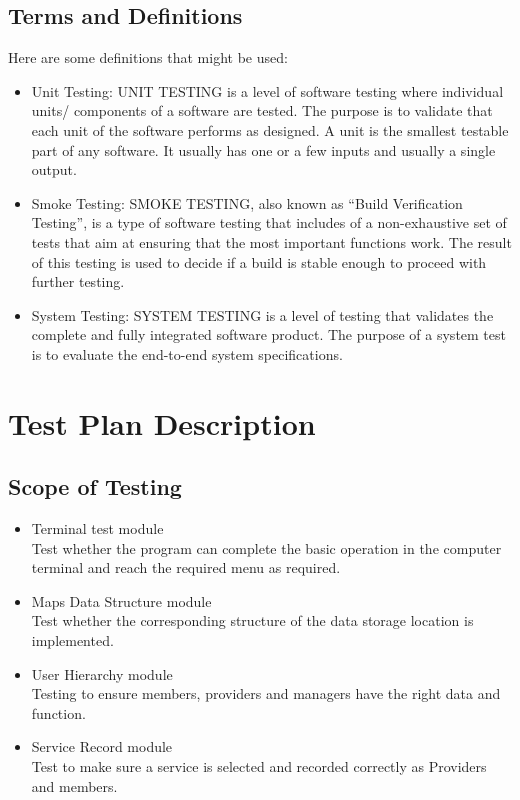 \documentclass{article}
\begin{document}
\subsection{Terms and Definitions}
Here are some definitions that might be used:

\begin{itemize}
\item Unit Testing: UNIT TESTING is a level of software testing where
individual units/ components of a software are tested. The
purpose is to validate that each unit of the software performs
as designed. A unit is the smallest testable part of any
software. It usually has one or a few inputs and usually a single
output.
\item Smoke Testing: SMOKE TESTING, also known as “Build Verification Testing”, is
a type of software testing that includes of a non-exhaustive set of tests that aim
at ensuring that the most important functions work. The result of this testing is
used to decide if a build is stable enough to proceed with further testing.
\item System Testing: SYSTEM TESTING is a level of testing that validates the
complete and fully integrated software product. The purpose of a system test is
to evaluate the end-to-end system specifications.
\end{itemize}


\section{Test Plan Description}

\subsection{Scope of Testing}

\begin{itemize}
   \item Terminal test module \\
      Test whether the program can complete the basic operation in the
      computer terminal and reach the required menu as required.
   \item Maps Data Structure module \\
      Test whether the corresponding structure of the data storage
      location is implemented.
   \item User Hierarchy module \\
      Testing to ensure members, providers and managers have the right data
      and function.
   \item Service Record module \\
      Test to make sure a service is selected and recorded correctly as
      Providers and members.
\end{itemize}
\end{document}
